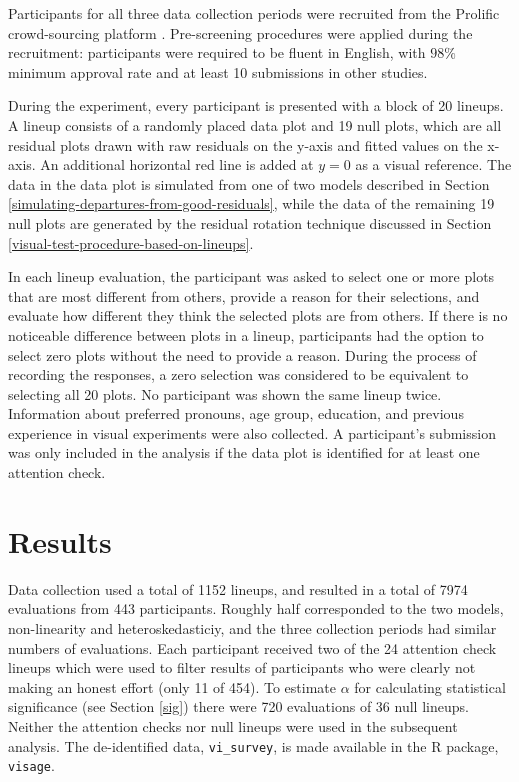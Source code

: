 \documentclass[]{interact}
\theoremstyle{plain}%
\theoremstyle{definition}
\theoremstyle{remark}
\begin{document}
Participants for all three data collection periods were recruited from
the Prolific crowd-sourcing platform \citep{palan2018prolific}.
Pre-screening procedures were applied during the recruitment:
participants were required to be fluent in English, with \(98\%\)
minimum approval rate and at least 10 submissions in other studies.

During the experiment, every participant is presented with a block of 20
lineups. A lineup consists of a randomly placed data plot and 19 null
plots, which are all residual plots drawn with raw residuals on the
y-axis and fitted values on the x-axis. An additional horizontal red
line is added at \(y = 0\) as a visual reference. The data in the data
plot is simulated from one of two models described in Section
\ref{simulating-departures-from-good-residuals}, while the data of the
remaining 19 null plots are generated by the residual rotation technique
discussed in Section \ref{visual-test-procedure-based-on-lineups}.

In each lineup evaluation, the participant was asked to select one or
more plots that are most different from others, provide a reason for
their selections, and evaluate how different they think the selected
plots are from others. If there is no noticeable difference between
plots in a lineup, participants had the option to select zero plots
without the need to provide a reason. During the process of recording
the responses, a zero selection was considered to be equivalent to
selecting all 20 plots. No participant was shown the same lineup twice.
Information about preferred pronouns, age group, education, and previous
experience in visual experiments were also collected. A participant's
submission was only included in the analysis if the data plot is
identified for at least one attention check.

\hypertarget{results}{%
\section{Results}\label{results}}

Data collection used a total of 1152 lineups, and resulted in a total of
7974 evaluations from 443 participants. Roughly half corresponded to the
two models, non-linearity and heteroskedasticiy, and the three
collection periods had similar numbers of evaluations. Each participant
received two of the 24 attention check lineups which were used to filter
results of participants who were clearly not making an honest effort
(only 11 of 454). To estimate \(\alpha\) for calculating statistical
significance (see Section \ref{sig}) there were 720 evaluations of 36
null lineups. Neither the attention checks nor null lineups were used in
the subsequent analysis. The de-identified data, \texttt{vi\_survey}, is
made available in the R package, \texttt{visage}.
\end{document}
